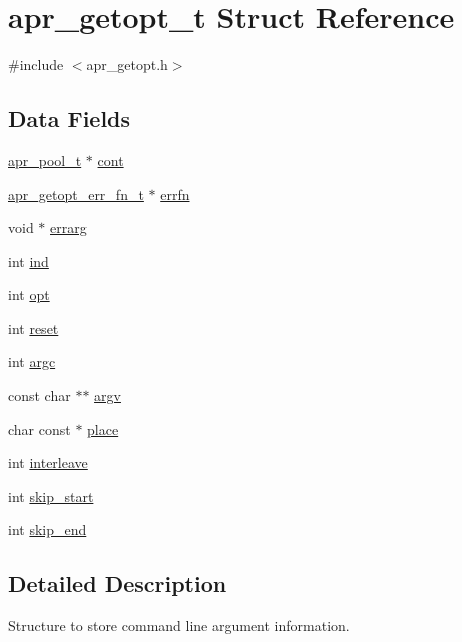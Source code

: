 \hypertarget{structapr__getopt__t}{}\section{apr\+\_\+getopt\+\_\+t Struct Reference}
\label{structapr__getopt__t}


{\ttfamily \#include $<$apr\+\_\+getopt.\+h$>$}

\subsection*{Data Fields}
\begin{DoxyCompactItemize}
\item 
\hyperlink{group__apr__pools_gaf137f28edcf9a086cd6bc36c20d7cdfb}{apr\+\_\+pool\+\_\+t} $\ast$ \hyperlink{structapr__getopt__t_a63a073fb9c11bb2713b3d7f967e95a24}{cont}
\item 
\hyperlink{group__apr__getopt_ga67c949e3d93e50e12347acd92a3bbe18}{apr\+\_\+getopt\+\_\+err\+\_\+fn\+\_\+t} $\ast$ \hyperlink{structapr__getopt__t_a6bf3fd7ad92d1f0161cd895e1ad50d06}{errfn}
\item 
void $\ast$ \hyperlink{structapr__getopt__t_a46db55c58789ab7fa99bb49544b0776e}{errarg}
\item 
int \hyperlink{structapr__getopt__t_ab04d49d670f095c3244dc9792b70ff07}{ind}
\item 
int \hyperlink{structapr__getopt__t_a4f842391b8f8f19e562584fdd29d0654}{opt}
\item 
int \hyperlink{structapr__getopt__t_abc4e72bc761666c0b0d9015c3b0de8c3}{reset}
\item 
int \hyperlink{structapr__getopt__t_a58aeb33137aabdd5a00efbde05652094}{argc}
\item 
const char $\ast$$\ast$ \hyperlink{structapr__getopt__t_a296c27d8db2fe6d4b88c5c7a85c40c02}{argv}
\item 
char const $\ast$ \hyperlink{structapr__getopt__t_a87961387d1c71bebfbdf69c7f392d2d5}{place}
\item 
int \hyperlink{structapr__getopt__t_a771dbef87345c731845dd63723fb34db}{interleave}
\item 
int \hyperlink{structapr__getopt__t_a0cd41eedf9ed82bf5d9dcc3491ee67dd}{skip\+\_\+start}
\item 
int \hyperlink{structapr__getopt__t_ae9e7e6eb1576820c7dc6e589cc3a28b7}{skip\+\_\+end}
\end{DoxyCompactItemize}


\subsection{Detailed Description}
Structure to store command line argument information. 

